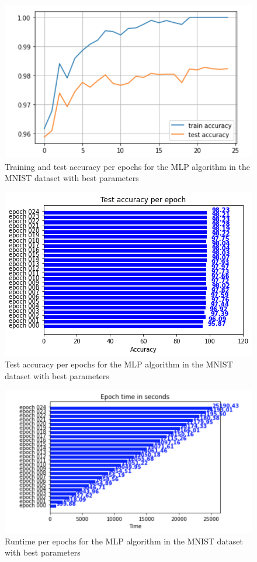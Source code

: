 \documentclass[conference]{IEEEtran}
\begin{document}
\begin{figure}[H]
\centering
\includegraphics[scale = 0.50]{figs/newtrainandtestMNIST.png}
\caption{Training and test accuracy per epochs for the MLP algorithm in the MNIST dataset with best parameters}
\label{fig:bestTrainingandTestAccMNIST}
\end{figure}

\begin{figure}[H]
\centering
\includegraphics[scale = 0.50]{figs/bestTestAcc_MNIST.png}
\caption{Test accuracy per epochs for the MLP algorithm in the MNIST dataset with best parameters}
\label{fig:bestTestAcc_MNIST}
\end{figure}

\begin{figure}[H]
\centering
\includegraphics[scale = 0.50]{figs/bestParamsEpocTimes_MNIST.png}
\caption{Runtime per epochs for the MLP algorithm in the MNIST dataset with best parameters}
\label{fig:bestRuntimeEpochMNIST}
\end{figure}
\end{document}
